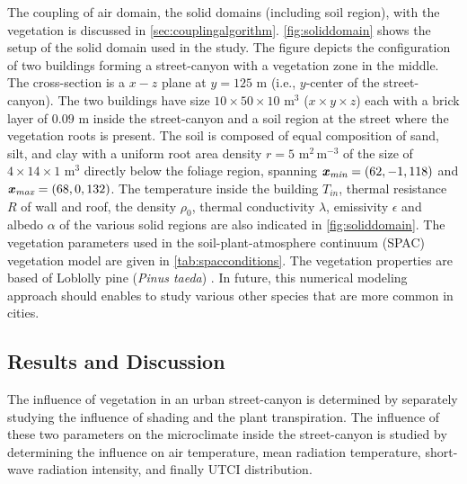 The coupling of air domain, the solid domains (including soil region), with the vegetation is discussed in \cref{sec:couplingalgorithm}. \cref{fig:soliddomain} shows the setup of the solid domain used in the study. The figure depicts the configuration of two buildings forming a street-canyon with a vegetation zone in the middle. The cross-section is a $x-z$ plane at $y=125$ m  (i.e., $y$-center of the street-canyon). The two buildings have size $10 \times 50 \times 10$ m$^3$ ($x\times y \times z$) each with a brick layer of $0.09$ m inside the street-canyon and a soil region at the street where the vegetation roots is present. The soil is composed of equal composition of sand, silt, and clay with a uniform root area density $r = 5$ m$^{2}$\,m$^{-3}$ of the size of $4 \times 14 \times 1$ m$^{3}$ directly below the foliage region, spanning $\textbf{\textit{x}}_{\textit{min}} = (62, -1, 118)$ and $\textbf{\textit{x}}_{\textit{max}} = (68, 0, 132)$. The temperature inside the building $T_{\textit{in}}$, thermal resistance $R$ of wall and roof, the density $\rho_0$, thermal conductivity $\lambda$, emissivity $\epsilon$ and albedo $\alpha$ of the various solid regions are also indicated in \cref{fig:soliddomain}. The vegetation parameters used in the soil-plant-atmosphere continuum (SPAC) vegetation model are given in \cref{tab:spacconditions}. The vegetation properties are based of Loblolly pine (\textit{Pinus taeda}) \citep{Manoli2014,Volpe2013,Launiainen2015,Manzoni2011,Vogel2016}.  In future, this numerical modeling approach should enables to study various other species that are more common in cities.

\subsection{Results and Discussion}


 The influence of vegetation in an urban street-canyon is determined by separately studying the influence of shading and the plant transpiration. The influence of these two parameters on the microclimate inside the street-canyon is studied by determining the influence on air temperature, mean radiation temperature, short-wave radiation intensity, and finally UTCI distribution. 

